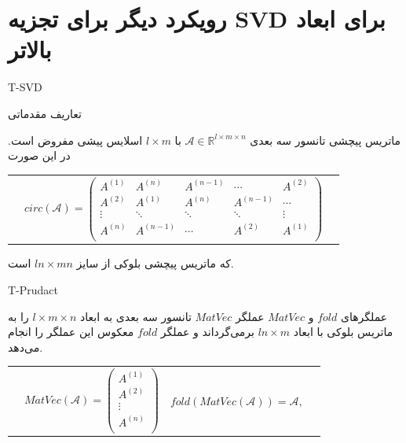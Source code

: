 \section{رویکرد دیگر برای تجزیه SVD برای ابعاد بالاتر}
\begin{frame}[standout]
T-SVD
\end{frame}
\begin{frame}
{تعاریف مقدماتی}
 \begin{alertblock}{ماتریس پیچشی}
	 تانسور سه بعدی
	$\mathcal{A}\in\mathbb{R}^{l\times m\times n}$
	با $l\times m$ اسلایس پیشی مفروض است. در این صورت
	\begin{tabular}{p{0.7cm}cc}
	 	&
	$
	circ(\mathcal{A})=\begin{pmatrix}
	A^{(1)}&A^{(n)}&A^{(n-1)}&\cdots &A^{(2)}\\
	A^{(2)}&A^{(1)}&A^{(n)}&A^{(n-1)}&\cdots \\
	\vdots &\ddots&\ddots&\ddots&\vdots\\	
	A^{(n)}&A^{(n-1)}&\cdots &A^{(2)}&A^{(1)}\\
	\end{pmatrix}
	$
	&
\end{tabular}
که ماتریس پیچشی بلوکی از سایز 
$ln\times mn$
است.
\end{alertblock}
\end{frame}
\begin{frame}{T-Prudact}
\begin{exampleblock}{عملگرهای $fold$ و $MatVec$}
	عملگر $MatVec$ تانسور سه بعدی به ابعاد 
	$l\times m\times n$
	را به ماتریس بلوکی با ابعاد 
	$ln \times m$
	برمی‌گرداند و عملگر $fold$ معکوس این عملگر را انجام می‌دهد.
	
	\begin{tabular}{p{0.9cm}ccc}
&$	MatVec(\mathcal{A})=\begin{pmatrix}
A^{(1)}\\A^{(2)}\\\vdots\\ A^{(n)}\\
\end{pmatrix}$&
$fold(MatVec(\mathcal{A}))=\mathcal{A},$&
	\end{tabular}
\end{exampleblock}
\end{frame}
